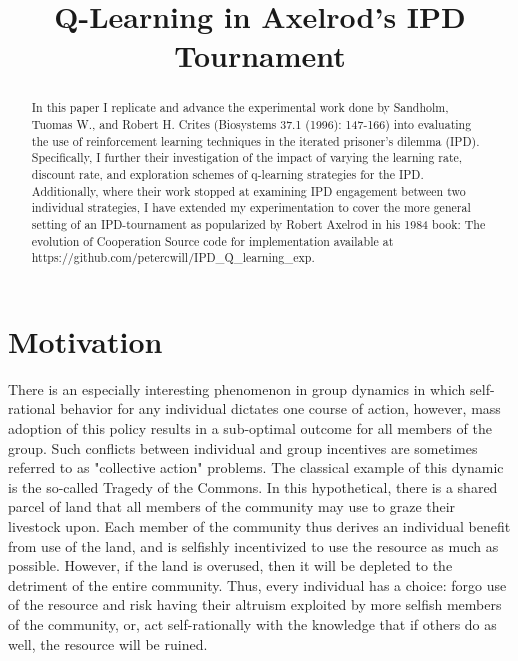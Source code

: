 \documentclass[12pt]{amsart}
\title[Q-Learning in Axelrod's IPD Tournament]
{Q-Learning in Axelrod's IPD Tournament}
\newcommand{\0}{\mat{0}}
\newcommand{\1}{\mathds{1}}
\begin{document}
\begin{abstract}
  In this paper I replicate and advance the experimental work done by Sandholm, Tuomas W., and Robert H. Crites (Biosystems 37.1 (1996): 147-166) into evaluating the use of reinforcement learning techniques in the iterated prisoner's dilemma (IPD).  Specifically, I further their investigation of the impact of varying the learning rate, discount rate, and exploration schemes of q-learning strategies for the IPD.  Additionally, where their work stopped at examining IPD engagement between two individual strategies, I have extended my experimentation to cover the more general setting of an IPD-tournament as popularized by Robert Axelrod in his 1984 book: The evolution of Cooperation  \newline \newline
  Source code for implementation available at \newline https://github.com/petercwill/IPD\_Q\_learning\_exp.

\end{abstract}

\maketitle

\section{Motivation}
There is an especially interesting phenomenon in group dynamics in which self-rational behavior for any individual dictates one course of action, however, mass adoption of this policy results in a sub-optimal outcome for all members of the group.  Such conflicts between individual and group incentives are sometimes referred to as "collective action" problems.  The classical example of this dynamic is the so-called Tragedy of the Commons. In this hypothetical, there is a shared parcel of land that all members of the community may use to graze their livestock upon.  Each member of the community thus derives an individual benefit from use of the land, and is selfishly incentivized to use the resource as much as possible.  However, if the land is overused, then it will be depleted to the detriment of the entire community.  Thus, every individual has a choice: forgo use of the resource and risk having their altruism exploited by more selfish members of the community, or, act self-rationally with the knowledge that if others do as well, the resource will be ruined.
\end{document}
